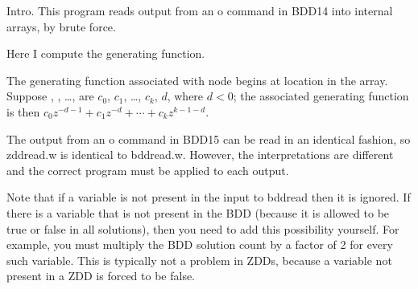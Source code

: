 
\datethis

Intro. This program reads output from an {\mc o} command in  {\mc
BDD14}
into internal arrays, by brute force.

Here I compute the generating function.

The generating function associated with node  begins at location
 in the  array. Suppose , , \dots,
are $c_0$, $c_1$, \dots, $c_k$, $d$, where $d<0$; the associated
generating function is then $c_0z^{-d-1}+c_1z^{-d}+\cdots+c_kz^{k-1-d}$.


The output from an {\mc o} command in {\mc BDD15}
can be read in an identical fashion,
so {\mc zddread.w} is identical to {\mc bddread.w}.
However, the interpretations are different
and the correct program must be applied to each output.

Note that if a variable is not present in the input to {\mc bddread}
then it is ignored.
If there is a variable that is not present in the BDD
(because it is allowed to be true or false in all solutions),
then you need to add this possibility yourself.
For example, you must multiply the BDD solution count by a factor of 2
for every such variable.
This is typically not a problem in ZDDs,
because a variable not present in a ZDD is forced to be false.

